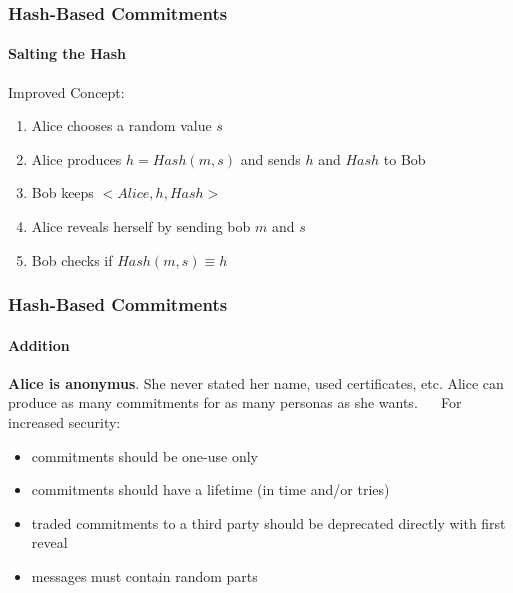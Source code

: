 \begin{frame}
	\frametitle{Hash-Based Commitments}
	\framesubtitle{Salting the Hash}
	Improved Concept: 
	\begin{LARGE}
		\begin{enumerate}
			\item Alice chooses a random value $s$
			\item Alice produces $h = Hash(m,s)$ and sends $h$ and $Hash$ to Bob
			\item Bob keeps $<Alice,h,Hash>$
			\item Alice reveals herself by sending bob $m$ and $s$
			\item Bob checks if $Hash(m,s) \equiv h$
		\end{enumerate}
	\end{LARGE}
\end{frame}

\begin{frame}
	\frametitle{Hash-Based Commitments}
	\framesubtitle{Addition}
	\textbf{Alice is anonymus}. She never stated her name, used certificates, etc. \newline
	Alice can produce as many commitments for as many personas as she wants.  
	~\newline ~\newline
	For increased security: 
	\begin{itemize}
		\item commitments should be one-use only
		\item commitments should have a lifetime (in time and/or tries)
		\item traded commitments to a third party should be deprecated directly with first reveal
		\item messages must contain random parts
	\end{itemize}
\end{frame}